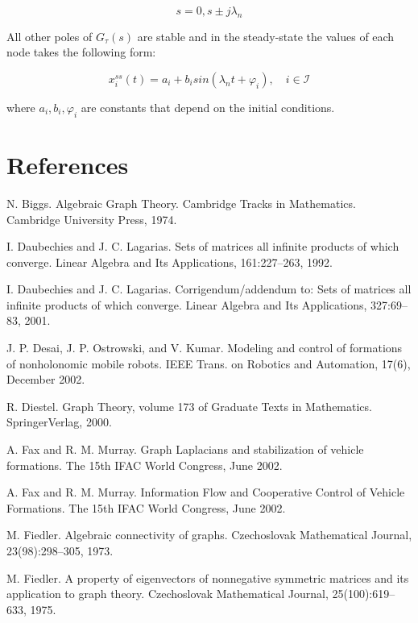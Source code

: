 \documentclass{article}
\begin{document}
\begin{equation}
    \tag{63}
    \label{63}
    s = 0, s \pm j\lambda_n
\end{equation}

{\color[gray]{0.5}
\noindent All other poles of $G_{\tau}(s)$ are stable and in the steady-state the values of each node takes the following form: 
}



\begin{equation}
    \tag{64}
    \label{64}
    x_i^{ss}(t) = a_i + b_i sin(\lambda_nt + \varphi_i),\quad i\in\mathcal{I}
\end{equation}

{\color[gray]{0.5}
\noindent where $a_i,b_i,\varphi_i$ are constants that depend on the initial conditions. 
}



\section*{References}
\noindent [1] N. Biggs. Algebraic Graph Theory. Cambridge Tracks in Mathematics. Cambridge University Press, 1974.

\noindent [2] I. Daubechies and J. C. Lagarias. Sets of matrices all inﬁnite products of which converge. Linear Algebra and Its Applications, 161:227–263, 1992. 

\noindent [3] I. Daubechies and J. C. Lagarias. Corrigendum/addendum to: Sets of matrices all inﬁnite products of which converge. Linear Algebra and Its Applications, 327:69–83, 2001. 

\noindent [4] J. P. Desai, J. P. Ostrowski, and V. Kumar. Modeling and control of formations of nonholonomic mobile robots. IEEE Trans. on Robotics and Automation, 17(6), December 2002. 

\noindent [5] R. Diestel. Graph Theory, volume 173 of Graduate Texts in Mathematics. SpringerVerlag, 2000.

\noindent [6] A. Fax and R. M. Murray. Graph Laplacians and stabilization of vehicle formations. The 15th IFAC World Congress, June 2002. 

\noindent [7] A. Fax and R. M. Murray. Information Flow and Cooperative Control of Vehicle Formations. The 15th IFAC World Congress, June 2002. 

\noindent [8] M. Fiedler. Algebraic connectivity of graphs. Czechoslovak Mathematical Journal, 23(98):298–305, 1973.

\noindent [9] M. Fiedler. A property of eigenvectors of nonnegative symmetric matrices and its application to graph theory. Czechoslovak Mathematical Journal, 25(100):619–633, 1975. 
\end{document}
